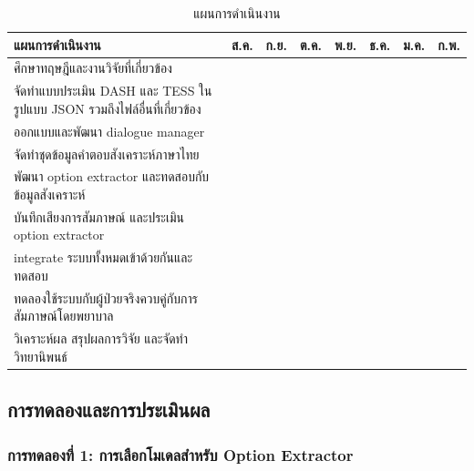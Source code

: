 \begin{table}[htbp]
  \centering
  \renewcommand{\arraystretch}{1.6}
  \setlength{\tabcolsep}{4pt}
  \begin{tabular}{|C{6.2cm}|*{7}{C{1.05cm}|}}
    \hline
    \textbf{แผนการดำเนินงาน} & \textbf{ส.ค.} & \textbf{ก.ย.} & \textbf{ต.ค.} & \textbf{พ.ย.} & \textbf{ธ.ค.} & \textbf{ม.ค.} & \textbf{ก.พ.} \\
    \hline
    ศึกษาทฤษฎีและงานวิจัยที่เกี่ยวข้อง
      & \g & \g &    &    &    &    &    \\ \hline
    จัดทำแบบประเมิน DASH และ TESS ในรูปแบบ JSON รวมถึงไฟล์อื่นที่เกี่ยวข้อง
      &    & \g &    &    &    &    &    \\ \hline
    ออกแบบและพัฒนา dialogue manager
      &    & \g & \g &    &    &    &    \\ \hline
    จัดทำชุดข้อมูลคำตอบสังเคราะห์ภาษาไทย
      &    &    & \g &    &    &    &    \\ \hline
    พัฒนา option extractor และทดสอบกับข้อมูลสังเคราะห์
      &    &    & \g & \g &    &    &    \\ \hline
    บันทึกเสียงการสัมภาษณ์ และประเมิน option extractor
    &    &    &    & \g & \g &    &    \\ \hline
    integrate ระบบทั้งหมดเข้าด้วยกันและทดสอบ
      &    &    &    &  & \g &    &    \\ \hline
    ทดลองใช้ระบบกับผู้ป่วยจริงควบคู่กับการสัมภาษณ์โดยพยาบาล
      &    &    &    &    & \g & \g &    \\ \hline
    วิเคราะห์ผล สรุปผลการวิจัย และจัดทำวิทยานิพนธ์
      &    &    &    &    &    & \g & \g \\ \hline
  \end{tabular}
  \caption{แผนการดำเนินงาน}
\label{tab:plan}
\end{table}

\newpage
\subsection{การทดลองและการประเมินผล}

\subsubsection{การทดลองที่ 1: การเลือกโมเดลสำหรับ Option Extractor}

